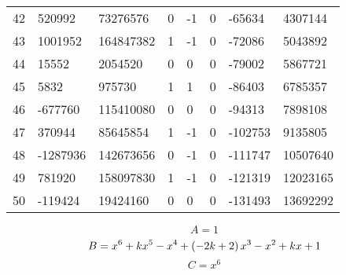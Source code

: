 \documentclass{amsart}
\begin{document}
\begin{longtable}{|l|l|l|lllll|}
42&520992&73276576&0&-1&0&-65634&4307144\\
43&1001952&164847382&1&-1&0&-72086&5043892\\
44&15552&2054520&0&0&0&-79002&5867721\\
45&5832&975730&1&1&0&-86403&6785357\\
46&-677760&115410080&0&0&0&-94313&7898108\\
47&370944&85645854&1&-1&0&-102753&9135805\\
48&-1287936&142673656&0&-1&0&-111747&10507640\\
49&781920&158097830&1&-1&0&-121319&12023165\\
50&-119424&19424160&0&0&0&-131493&13692292\\
\hline
\end{longtable}
$$A=1$$
$$B=x^6
 + k\*x^5
 - x^4
 + \left(-2\*k
 + 2\right) \*x^3
 - x^2
 + k\*x
 + 1$$
$$C=x^6$$
\end{document}
